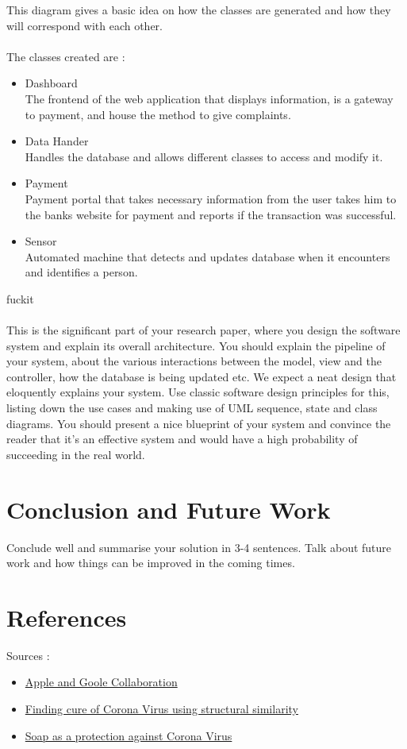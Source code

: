 \documentclass[10pt,twocolumn,letterpaper]{article}
\begin{document}
\noindent This diagram gives a basic idea on how the classes are generated 
and how they will correspond with each other.
\\\\
The classes created are :
\begin{itemize}
    \item Dashboard\\
    The frontend of the web application that displays information, is a gateway to 
    payment, and house the method to give complaints.
    \item Data Hander\\
    Handles the database and allows different classes to access and modify it.
    \item Payment\\
    Payment portal that takes necessary information from the user takes him to the 
    banks website for payment and reports if the transaction was successful.
    \item Sensor\\
    Automated machine that detects and updates database when it encounters and 
    identifies a person.
\end{itemize}
fuckit
\\\\

This is the significant part of your research paper, where you design the 
software system and explain its overall architecture. You should explain 
the pipeline of your system, about the various interactions between the model, 
view and the controller, how the database is being updated etc. We expect a neat 
design that eloquently explains your system. Use classic software design principles 
for this, listing down the use cases and making use of UML sequence, state and 
class diagrams. You should present a nice blueprint of your system and convince 
the reader that it’s an effective system and would have a high probability of 
succeeding in the real world.

\section*{Conclusion and Future Work}
Conclude well and summarise your solution in 3-4 sentences. 
Talk about future work and how things can be improved in the coming times.

\section*{References}
Sources :
\begin{itemize}
    \item \href{https://www.apple.com/in/newsroom/2020/04/apple-and-google-partner-on-covid-19-contact-tracing-technology/}{Apple and Goole Collaboration}
    \item \href{https://science.sciencemag.org/content/368/6489/409}{Finding cure of Corona Virus using structural similarity}
    \item \href{https://www.thehindu.com/sci-tech/science/how-does-soap-use-help-in-tackling-covid-19/article31070630.ece}{Soap as a protection against Corona Virus}
\end{itemize}
\end{document}
